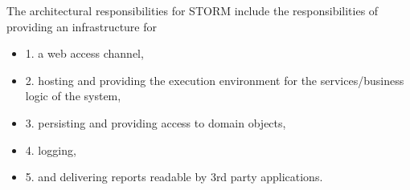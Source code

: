 The architectural responsibilities for STORM include the responsibilities of providing an infrastructure for
\begin{itemize}
\item 1. a web access channel,
\item 2. hosting and providing the execution environment for the services/business logic of the system,
\item 3. persisting and providing access to domain objects,
\item 4. logging,
\item 5. and delivering reports readable by 3rd party applications.
\end{itemize}